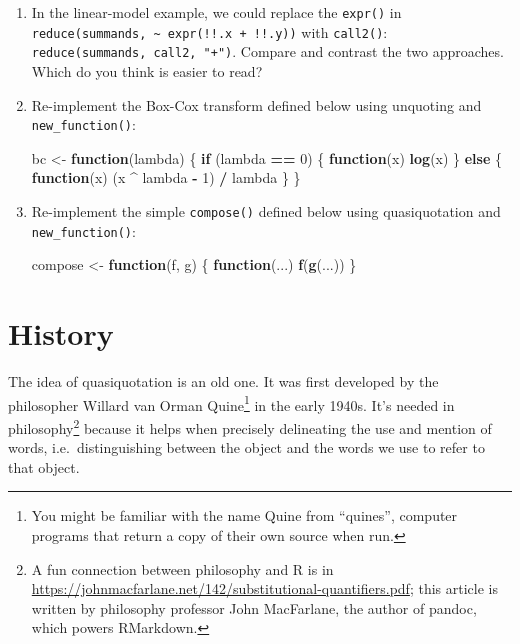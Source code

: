\documentclass[]{book}
\newenvironment{Shaded}{\begin{snugshade}}{\end{snugshade}}
\newcommand{\ControlFlowTok}[1]{\textcolor[rgb]{0.27,0.27,0.27}{\textbf{#1}}}
\newcommand{\DecValTok}[1]{\textcolor[rgb]{0.06,0.06,0.06}{#1}}
\newcommand{\KeywordTok}[1]{\textcolor[rgb]{0.27,0.27,0.27}{\textbf{#1}}}
\newcommand{\NormalTok}[1]{#1}
\newcommand{\OperatorTok}[1]{\textcolor[rgb]{0.43,0.43,0.43}{\textbf{#1}}}
\newcommand{\StringTok}[1]{\textcolor[rgb]{0.5,0.5,0.5}{#1}}
\let\rmarkdownfootnote\footnote%
\def\footnote{\protect\rmarkdownfootnote}
\begin{document}
\begin{enumerate}
\def\labelenumi{\arabic{enumi}.}
\item
  In the linear-model example, we could replace the \texttt{expr()} in
  \texttt{reduce(summands,\ \textasciitilde{}\ expr(!!.x\ +\ !!.y))} with \texttt{call2()}:
  \texttt{reduce(summands,\ call2,\ "+")}. Compare and contrast the two
  approaches. Which do you think is easier to read?
\item
  Re-implement the Box-Cox transform defined below using unquoting and
  \texttt{new\_function()}:

\begin{Shaded}
\begin{Highlighting}[]
\NormalTok{bc <-}\StringTok{ }\ControlFlowTok{function}\NormalTok{(lambda) \{}
  \ControlFlowTok{if}\NormalTok{ (lambda }\OperatorTok{==}\StringTok{ }\DecValTok{0}\NormalTok{) \{}
    \ControlFlowTok{function}\NormalTok{(x) }\KeywordTok{log}\NormalTok{(x)}
\NormalTok{  \} }\ControlFlowTok{else}\NormalTok{ \{}
    \ControlFlowTok{function}\NormalTok{(x) (x }\OperatorTok{^}\StringTok{ }\NormalTok{lambda }\OperatorTok{-}\StringTok{ }\DecValTok{1}\NormalTok{) }\OperatorTok{/}\StringTok{ }\NormalTok{lambda}
\NormalTok{  \}}
\NormalTok{\}}
\end{Highlighting}
\end{Shaded}
\item
  Re-implement the simple \texttt{compose()} defined below using quasiquotation and
  \texttt{new\_function()}:

\begin{Shaded}
\begin{Highlighting}[]
\NormalTok{compose <-}\StringTok{ }\ControlFlowTok{function}\NormalTok{(f, g) \{}
  \ControlFlowTok{function}\NormalTok{(...) }\KeywordTok{f}\NormalTok{(}\KeywordTok{g}\NormalTok{(...))}
\NormalTok{\}}
\end{Highlighting}
\end{Shaded}
\end{enumerate}

\hypertarget{history}{%
\section{History}\label{history}}

The idea of quasiquotation is an old one. It was first developed by the philosopher Willard van Orman Quine\footnote{You might be familiar with the name Quine from ``quines'', computer programs that return a copy of their own source when run.} in the early 1940s. It's needed in philosophy\footnote{A fun connection between philosophy and R is in \url{https://johnmacfarlane.net/142/substitutional-quantifiers.pdf}; this article is written by philosophy professor John MacFarlane, the author of pandoc, which powers RMarkdown.} because it helps when precisely delineating the use and mention of words, i.e.~distinguishing between the object and the words we use to refer to that object.
\end{document}
